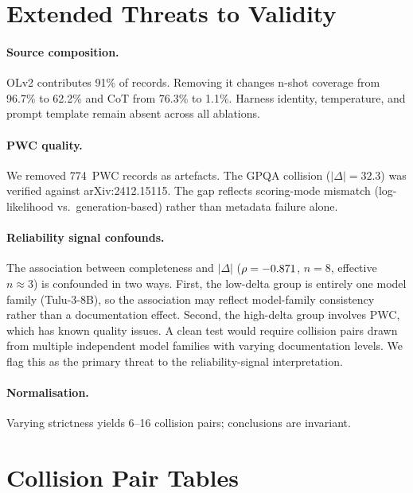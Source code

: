 \documentclass[11pt]{article}
\begin{document}
\section{Extended Threats to Validity}\label{app:threats}

\paragraph{Source composition.}
OLv2 contributes 91\% of records. Removing it changes n-shot
coverage from 96.7\% to 62.2\% and CoT from 76.3\% to 1.1\%.
Harness identity, temperature, and prompt template remain absent
across all ablations.

\paragraph{PWC quality.}
We removed 774~PWC records as artefacts. The GPQA collision
($|\Delta|=32.3$) was verified against arXiv:2412.15115. The gap
reflects scoring-mode mismatch (log-likelihood vs.\
generation-based) rather than metadata failure alone.

\paragraph{Reliability signal confounds.}
The association between completeness and $|\Delta|$
($\rho = -0.871{}$, $n = 8$, effective $n \approx 3$) is
confounded in two ways. First, the low-delta group
is entirely one model family (Tulu-3-8B), so the association may
reflect model-family consistency rather than a documentation
effect. Second, the high-delta group involves PWC, which has
known quality issues. A clean test would require collision pairs
drawn from multiple independent model families with varying
documentation levels. We flag this as the primary threat to the
reliability-signal interpretation.

\paragraph{Normalisation.}
Varying strictness yields 6--16 collision pairs; conclusions are
invariant.

\section{Collision Pair Tables}\label{app:tables}
\end{document}
